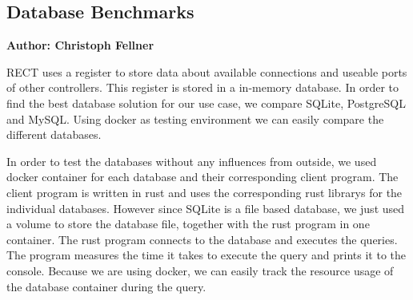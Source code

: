 \subsection{Database Benchmarks}
\textbf{Author: Christoph Fellner}

RECT uses a register to store data about available connections and useable ports of other controllers. This register is stored in a in-memory database. In order to find the 
best database solution for our use case, we compare SQLite, PostgreSQL and MySQL. Using docker as testing environment we can easily compare the different databases.

In order to test the databases without any influences from outside, we used docker container for each database and their corresponding client program. The client program
is written in rust and uses the corresponding rust librarys for the individual databases. However since SQLite is a file based database, we just used a volume to store the
database file, together with the rust program in one container. The rust program connects to the database and executes the queries. The program measures the time it 
takes to execute the query and prints it to the console. Because we are using docker, we can easily track the resource usage of the database container during the query. 

\filbreak